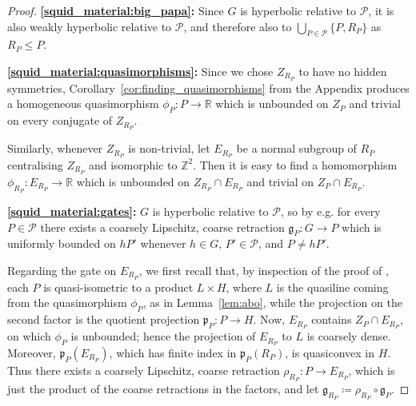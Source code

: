 \documentclass[svgnames]{amsart}
\theoremstyle{plain}
\theoremstyle{definition}
\newcommand{\Z}{\mathbb{Z}}
\newcommand{\gate}{\mathfrak{g}}
\newcommand{\p}{\mathfrak{p}}
\begin{document}
\begin{proof}
\par\medskip
\textbf{\eqref{squid_material:big_papa}:} Since $G$ is hyperbolic relative to $\mathcal P$, it is also weakly hyperbolic relative to $\mathcal P$, and therefore also to $\bigcup_{P\in \mathcal P}\{P,{R_P}\}$ as ${R_P}\le P$.


\par\medskip
\textbf{\eqref{squid_material:quasimorphisms}:} Since we chose $Z_{R_P}$ to have no hidden symmetries, Corollary~\ref{cor:finding_quasimorphisms} from the Appendix produces a homogeneous quasimorphism $\phi_P\colon P\to \mathbb{R}$ which is unbounded on $Z_P$ and trivial on every conjugate of $Z_{R_P}$.


Similarly, whenever $Z_{R_P}$ is non-trivial, let $E_{R_P}$ be a normal subgroup of ${R_P}$ centralising  $Z_{R_P}$ and isomorphic to $\Z^2$. 
Then it is easy to find a homomorphism $\phi_{R_P}\colon E_{R_P}\to \mathbb{R}$ which is unbounded on $Z_{R_P}\cap E_{R_P}$ and trivial on $Z_P\cap E_{R_P}$.

\par\medskip
\textbf{\eqref{squid_material:gates}:} $G$ is hyperbolic relative to $\mathcal P$, so by e.g. \cite[Theorem 2.14]{sisto_treegraded} for every $P\in \mathcal P$ there exists a coarsely Lipschitz, coarse retraction $\gate_{P}\colon G\to P$ which is uniformly bounded on $hP'$ whenever $h\in G$, $P'\in \mathcal P$, and $P\neq hP'$. 

Regarding the gate on $E_{R_P}$, we first recall that, by inspection of the proof of \cite[Corollary 4.3]{HRSS_3manifold}, each $P$ is quasi-isometric to a product $L\times H$, where $L$ is the quasiline coming from the quasimorphism $\phi_P$, as in Lemma~\ref{lem:abo}, while the projection on the second factor is the quotient projection $\p_P\colon P\to H$. Now, $E_{R_P}$ contains $Z_P\cap E_{R_P}$, on which $\phi_P$ is unbounded; hence the projection of $E_{R_P}$ to $L$ is coarsely dense. Moreover, $\p_P(E_{R_P})$, which has finite index in $\p_P({R_P})$, is quasiconvex in $H$. Thus there exists a coarsely Lipschitz, coarse retraction $\rho_{R_P}\colon P\to E_{R_P}$, which is just the product of the coarse retractions in the factors, and let $\gate_{R_P}\coloneq \rho_{R_P}\circ \gate_P$. 


\end{proof}
\end{document}
